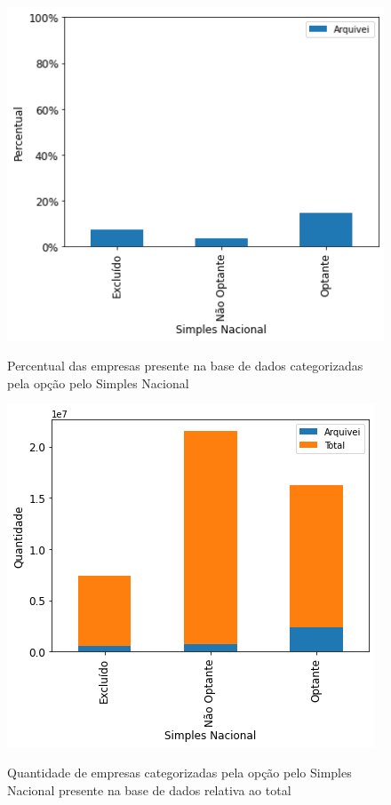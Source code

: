 \begin{figure}[htb]
    \centering
    \caption{Percentual das empresas presente na base de dados categorizadas pela opção pelo Simples Nacional}
    \includegraphics[scale=0.7]{images/base-de-dados-6.1-presenca-por-simples-nacional.png}
    \label{fig:base-de-dados:descritiva-6.1-presenca-por-porte}
    \fautor
\end{figure}

\begin{figure}[htb]
    \centering
    \caption{Quantidade de empresas categorizadas pela opção pelo Simples Nacional presente na base de dados relativa ao total}
    \includegraphics[scale=0.7]{images/base-de-dados-6.2-qtde-por-simples-nacional.png}
    \label{fig:base-de-dados:descritiva-6.2-qtde-por-porte}
    \fautor
\end{figure}

